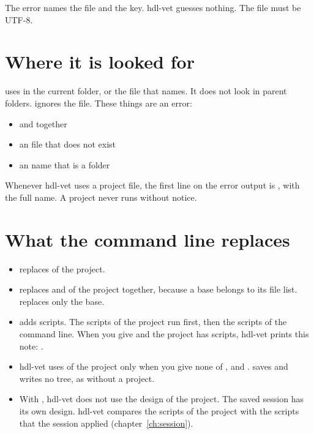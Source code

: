 The error names the file and the key. hdl-vet guesses nothing. The file must be UTF-8.

\section{Where it is looked for}

 uses  in the current folder, or the file that
 names. It does not look in parent folders.  ignores
the file. These things are an error:

\begin{itemize}
\item {} and  together
\item an  file that does not exist
\item an  name that is a folder
\end{itemize}

Whenever hdl-vet uses a project file, the first line on the error output is
, with the full name. A project never runs without notice.

\section{What the command line replaces}

\begin{itemize}
\item {} replaces  of the project.
\item {} replaces  and  of the project together,
  because a base belongs to its file list.  replaces only the base.
\item {} adds scripts. The scripts of the project run first, then the scripts of
  the command line. When you give  and the project has scripts, hdl-vet prints
  this note: .
\item hdl-vet uses  of the project only when you give none of ,
   and .  saves and writes no
  tree, as without a project.
\item With , hdl-vet does not use the design of the project. The saved
  session has its own design. hdl-vet compares the scripts of the project with the
  scripts that the session applied (chapter~\ref{ch:session}).
\end{itemize}

